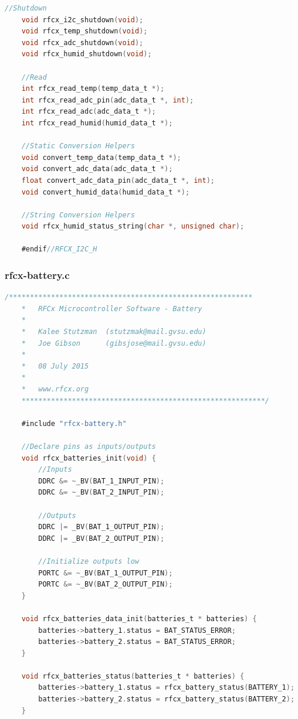 \documentclass{article}
\numberwithin{figure}{section}
\numberwithin{equation}{section}
\begin{document}
{\begin{lstlisting}[language=C,label=lst:rfcx-i2c.h,caption=rfcx-i2c.h]
    //Shutdown
    void rfcx_i2c_shutdown(void);
    void rfcx_temp_shutdown(void);
    void rfcx_adc_shutdown(void);
    void rfcx_humid_shutdown(void);

    //Read
    int rfcx_read_temp(temp_data_t *);
    int rfcx_read_adc_pin(adc_data_t *, int);
    int rfcx_read_adc(adc_data_t *);
    int rfcx_read_humid(humid_data_t *);

    //Static Conversion Helpers
    void convert_temp_data(temp_data_t *);
    void convert_adc_data(adc_data_t *);
    float convert_adc_data_pin(adc_data_t *, int);
    void convert_humid_data(humid_data_t *);

    //String Conversion Helpers
    void rfcx_humid_status_string(char *, unsigned char);

    #endif//RFCX_I2C_H
\end{lstlisting}

\subsubsection{rfcx-battery.c}\label{sect:rfcx-battery.c}
\begin{lstlisting}[language=C,label=lst:rfcx-battery.c,caption=rfcx-battery.c]
    /**********************************************************
    *	RFCx Microcontroller Software - Battery
    *
    *	Kalee Stutzman 	(stutzmak@mail.gvsu.edu)
    *	Joe Gibson		(gibsjose@mail.gvsu.edu)
    *
    *	08 July 2015
    *
    *   www.rfcx.org
    **********************************************************/

    #include "rfcx-battery.h"

    //Declare pins as inputs/outputs
    void rfcx_batteries_init(void) {
        //Inputs
        DDRC &= ~_BV(BAT_1_INPUT_PIN);
        DDRC &= ~_BV(BAT_2_INPUT_PIN);

        //Outputs
        DDRC |= _BV(BAT_1_OUTPUT_PIN);
        DDRC |= _BV(BAT_2_OUTPUT_PIN);

        //Initialize outputs low
        PORTC &= ~_BV(BAT_1_OUTPUT_PIN);
        PORTC &= ~_BV(BAT_2_OUTPUT_PIN);
    }

    void rfcx_batteries_data_init(batteries_t * batteries) {
        batteries->battery_1.status = BAT_STATUS_ERROR;
        batteries->battery_2.status = BAT_STATUS_ERROR;
    }

    void rfcx_batteries_status(batteries_t * batteries) {
        batteries->battery_1.status = rfcx_battery_status(BATTERY_1);
        batteries->battery_2.status = rfcx_battery_status(BATTERY_2);
    }


\end{lstlisting}}
\end{document}
